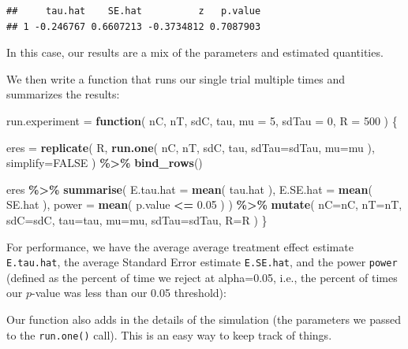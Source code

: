 \documentclass[
]{book}
\newenvironment{Shaded}{\begin{snugshade}}{\end{snugshade}}
\newcommand{\AttributeTok}[1]{\textcolor[rgb]{0.13,0.29,0.53}{#1}}
\newcommand{\ConstantTok}[1]{\textcolor[rgb]{0.56,0.35,0.01}{#1}}
\newcommand{\ControlFlowTok}[1]{\textcolor[rgb]{0.13,0.29,0.53}{\textbf{#1}}}
\newcommand{\DecValTok}[1]{\textcolor[rgb]{0.00,0.00,0.81}{#1}}
\newcommand{\FloatTok}[1]{\textcolor[rgb]{0.00,0.00,0.81}{#1}}
\newcommand{\FunctionTok}[1]{\textcolor[rgb]{0.13,0.29,0.53}{\textbf{#1}}}
\newcommand{\NormalTok}[1]{#1}
\newcommand{\OtherTok}[1]{\textcolor[rgb]{0.56,0.35,0.01}{#1}}
\newcommand{\SpecialCharTok}[1]{\textcolor[rgb]{0.81,0.36,0.00}{\textbf{#1}}}
\begin{document}
\begin{verbatim}
##     tau.hat    SE.hat          z   p.value
## 1 -0.246767 0.6607213 -0.3734812 0.7087903
\end{verbatim}

In this case, our results are a mix of the parameters and estimated quantities.

We then write a function that runs our single trial multiple times and
summarizes the results:

\begin{Shaded}
\begin{Highlighting}[]
\NormalTok{run.experiment }\OtherTok{=} \ControlFlowTok{function}\NormalTok{( nC, nT, sdC, tau, }\AttributeTok{mu =} \DecValTok{5}\NormalTok{, }\AttributeTok{sdTau =} \DecValTok{0}\NormalTok{, }\AttributeTok{R =} \DecValTok{500}\NormalTok{ ) \{}
  
\NormalTok{  eres }\OtherTok{=} \FunctionTok{replicate}\NormalTok{( R, }
                    \FunctionTok{run.one}\NormalTok{( nC, nT, sdC, tau, }\AttributeTok{sdTau=}\NormalTok{sdTau, }\AttributeTok{mu=}\NormalTok{mu ), }
                    \AttributeTok{simplify=}\ConstantTok{FALSE}\NormalTok{ ) }\SpecialCharTok{\%\textgreater{}\%}
    \FunctionTok{bind\_rows}\NormalTok{()}
  
\NormalTok{  eres }\SpecialCharTok{\%\textgreater{}\%} 
    \FunctionTok{summarise}\NormalTok{( }\AttributeTok{E.tau.hat =} \FunctionTok{mean}\NormalTok{( tau.hat ),}
               \AttributeTok{E.SE.hat =} \FunctionTok{mean}\NormalTok{( SE.hat ),}
               \AttributeTok{power =} \FunctionTok{mean}\NormalTok{( p.value }\SpecialCharTok{\textless{}=} \FloatTok{0.05}\NormalTok{ ) ) }\SpecialCharTok{\%\textgreater{}\%}
    \FunctionTok{mutate}\NormalTok{( }\AttributeTok{nC=}\NormalTok{nC, }\AttributeTok{nT=}\NormalTok{nT, }\AttributeTok{sdC=}\NormalTok{sdC, }\AttributeTok{tau=}\NormalTok{tau, }\AttributeTok{mu=}\NormalTok{mu, }\AttributeTok{sdTau=}\NormalTok{sdTau, }\AttributeTok{R=}\NormalTok{R )}
\NormalTok{\}}
\end{Highlighting}
\end{Shaded}

For performance, we have the average average treatment effect estimate \texttt{E.tau.hat},
the average Standard Error estimate \texttt{E.SE.hat},
and the power \texttt{power} (defined as the percent of time we reject at
alpha=0.05, i.e., the percent of times our \(p\)-value was less than our 0.05
threshold):

Our function also adds in the details of the simulation (the parameters we passed
to the \texttt{run.one()} call). This is an easy way to keep track of things.
\end{document}
